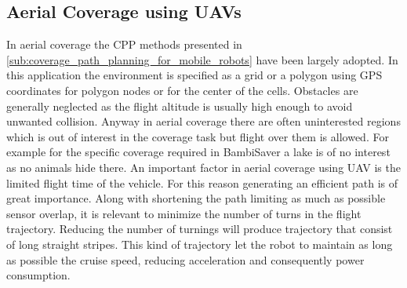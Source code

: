 \subsection{Aerial Coverage using UAVs} %
\label{sub:aerial_coverage_using_uavs}
In aerial coverage the CPP methods presented in \autoref{sub:coverage_path_planning_for_mobile_robots} have been largely adopted. In this application the environment is specified as a grid or a polygon using GPS coordinates for polygon nodes or for the center of the cells. Obstacles are generally neglected as the flight altitude is usually high enough to avoid unwanted collision. Anyway in aerial coverage there are often uninterested regions which is out of interest in the coverage task but flight over them is allowed. For example for the specific coverage required in BambiSaver a lake is of no interest as no animals hide there. An important factor in aerial coverage using UAV is the limited flight time of the vehicle. For this reason generating an efficient path is of great importance. Along with shortening the path limiting as much as possible sensor overlap, it is relevant to minimize the number of turns in the flight trajectory. Reducing the number of turnings will produce trajectory that consist of long straight stripes. This kind of trajectory let the robot to maintain as long as possible the cruise speed, reducing acceleration and consequently power consumption.

